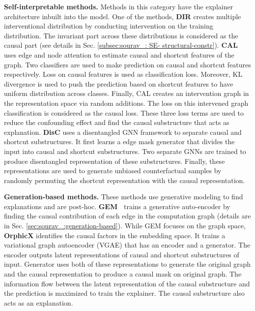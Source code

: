 \textbf{Self-interpretable methods.} Methods in this category have the explainer architecture inbuilt into the model. 
One of the methods, \textbf{DIR} \cite{D_invariant_rationale} creates multiple interventional distribution by conducting intervention on the training distribution. The invariant part across these distributions is considered as the causal part (see details in Sec. \ref{subsec:sourav_: SE- structural-constr}). \textbf{CAL} \cite{causal-attention} uses edge and node attention to estimate causal and shortcut features of the graph. Two classifiers are used to make prediction on causal and shortcut features respectively. Loss on causal features is used as classification loss. Moreover, KL divergence is used to push the prediction based on shortcut features to have uniform distribution across classes. Finally, CAL creates an intervention graph in the representation space via random additions. The loss on this intervened graph classification is considered as the causal loss. These three loss terms are used to reduce the confounding effect and find the causal substructure that acts as explanation. \textbf{DisC} \cite{causal-debiasing} uses a disentangled GNN framework to separate causal and shortcut substructures. It first learns a edge mask generator that divides the input into causal and shortcut substructures. Two separate GNNs are trained to produce disentangled representation of these substructures. Finally, these representations are used to generate unbiased counterfactual samples by randomly permuting the shortcut representation with the causal representation. %

\textbf{Generation-based methods.} These methods use generative modeling to find explanations and are post-hoc. \textbf{GEM~\cite{Gen-causal}} trains a generative auto-encoder by finding the causal contribution of each edge in the computation graph (details are in Sec. \ref{sec:sourav_:generation-based}). While GEM focuses on the graph space, \textbf{OrphicX} \cite{causal-orphicx} identifies the causal factors in the embedding space. It trains a variational graph autoencoder (VGAE) that has an encoder and a generator. The encoder outputs latent representations of causal and shortcut substructures of input. Generator uses both of these representations to generate the original graph and the causal representation to produce a causal mask on original graph. The information flow between the latent representation of the causal substructure and the prediction is maximized to train the explainer. The causal substructure also acts as an explanation.

